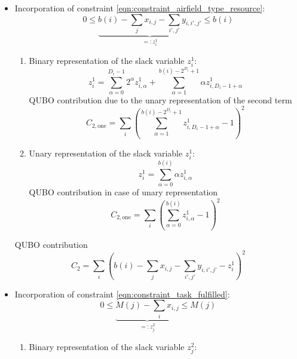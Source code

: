 \documentclass{article}
\begin{document}
\begin{itemize}
\item Incorporation of constraint \eqref{eqn:constraint_airfield_type_resource}:
    \begin{equation*}
        0 \leq \underbrace{b(i) - \sum_j x_{i,j} - \sum_{i', j'} y_{i, i', j'}}_{=:z^1_i} \leq b(i)
    \end{equation*}
    \begin{enumerate}
        \item 
        Binary representation of the slack variable $z^1_i$:
        \begin{equation*}
            z^1_{i} = \sum_{\alpha = 0}^{D_i - 1} 2^\alpha z^1_{i, \alpha} + \sum_{\alpha=1}^{b(i) - 2^{D_i} + 1} \alpha z^1_{i,  D_i - 1+ \alpha}
        \end{equation*}
        QUBO contribution due to the unary representation of the second term
        \begin{equation*}
            C_{2, \text{one}} = \sum_{i} \left( \sum_{\alpha = 1}^{b(i) - 2^{D_i} + 1} z^1_{i, D_i -1 + \alpha} - 1 \right)^2
        \end{equation*}
        \item 
        Unary representation of the slack variable $z^1_i$:
        \begin{equation*}
            z^1_{i} = \sum_{\alpha = 0}^{b(i)} \alpha z^1_{i, \alpha}
        \end{equation*}
        QUBO contribution in case of unary representation
        \begin{equation*}
            C_{2, \text{one}} = \sum_{i} \left( \sum_{\alpha = 0}^{b(i)} z^1_{i, \alpha} - 1 \right)^2
        \end{equation*}
    \end{enumerate}
    QUBO contribution
    \begin{equation*}
        C_2 = \sum_i \left( b(i) - \sum_j x_{i,j} - \sum_{i', j'} y_{i, i', j'} - z^1_i \right)^2
    \end{equation*}
\item Incorporation of constraint \eqref{eqn:constraint_task_fulfilled}:
    \begin{equation*}
        0 \leq \underbrace{M(j) - \sum_i x_{i,j}}_{=:z^2_j} \leq M(j)
    \end{equation*}
    \begin{enumerate}
        \item 
        Binary representation of the slack variable $z^2_j$:
        \begin{equation*}

\end{equation*}
\end{enumerate}
\end{itemize}
\end{document}
